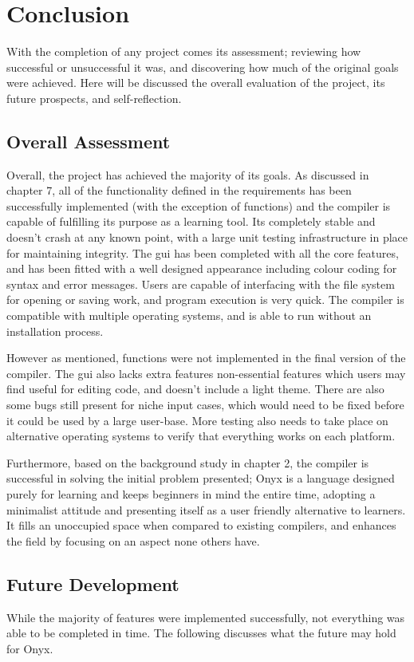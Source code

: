 \documentclass[
]{report}
\begin{document}
\chapter{Conclusion}
With the completion of any project comes its assessment; reviewing how
successful or unsuccessful it was, and discovering how much of the
original goals were achieved. Here will be discussed the overall
evaluation of the project, its future prospects, and self-reflection.

\section{Overall Assessment}
Overall, the project has achieved the majority of its goals. As
discussed in chapter 7, all of the functionality defined in the
requirements has been successfully implemented (with the exception of
functions) and the compiler is capable of fulfilling its purpose as a
learning tool. Its completely stable and doesn't crash at any known
point, with a large unit testing infrastructure in place for maintaining
integrity. The \acrshort{gui} has been completed with all the core features, and
has been fitted with a well designed appearance including colour coding
for syntax and error messages. Users are capable of interfacing with the
file system for opening or saving work, and program execution is very
quick. The compiler is compatible with multiple operating systems, and
is able to run without an installation process.

However as mentioned, functions were not implemented in the final
version of the compiler. The \acrshort{gui} also lacks extra features non-essential
features which users may find useful for editing code, and doesn't
include a light theme. There are also some bugs still present for niche
input cases, which would need to be fixed before it could be used by a
large user-base. More testing also needs to take place on alternative
operating systems to verify that everything works on each platform.

Furthermore, based on the background study in chapter 2, the compiler is
successful in solving the initial problem presented; Onyx is a language
designed purely for learning and keeps beginners in mind the entire
time, adopting a minimalist attitude and presenting itself as a user
friendly alternative to learners. It fills an unoccupied space when
compared to existing compilers, and enhances the field by focusing on an
aspect none others have.

\section{Future Development}
While the majority of features were implemented successfully, not
everything was able to be completed in time. The following discusses
what the future may hold for Onyx.
\end{document}
